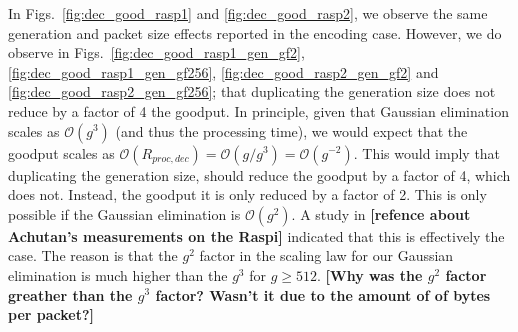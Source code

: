 In Figs.~\ref{fig:dec_good_rasp1} and \ref{fig:dec_good_rasp2}, we
observe the same generation and packet size effects reported in the
encoding case. However, we do observe in
Figs.~\ref{fig:dec_good_rasp1_gen_gf2}, \ref{fig:dec_good_rasp1_gen_gf256},
\ref{fig:dec_good_rasp2_gen_gf2} and \ref{fig:dec_good_rasp2_gen_gf256};
that duplicating the generation size does not reduce by a factor of 4 the
goodput. In principle, given that Gaussian elimination scales as
$\mathcal{O}(g^3)$ (and thus the processing time), we would expect that
the goodput scales as $\mathcal{O}(R_{proc,dec}) = \mathcal{O}(g/g^{3}) =
\mathcal{O}(g^{-2})$. This would imply that duplicating the generation
size, should reduce the goodput by a factor of 4, which does not. Instead,
the goodput it is only reduced by a factor of 2. This is only possible if
the Gaussian elimination is $\mathcal{O}(g^2)$. A study in
\textbf{[refence about Achutan's measurements on the Raspi]} indicated
that this is effectively the case. The reason is that the $g^2$ factor in
the scaling law for our Gaussian elimination is much higher than the $g^3$
for $g \geq 512$. \textbf{[Why was the $g^2$ factor greather than the
$g^3$ factor? Wasn't it due to the amount of of bytes per packet?]}

